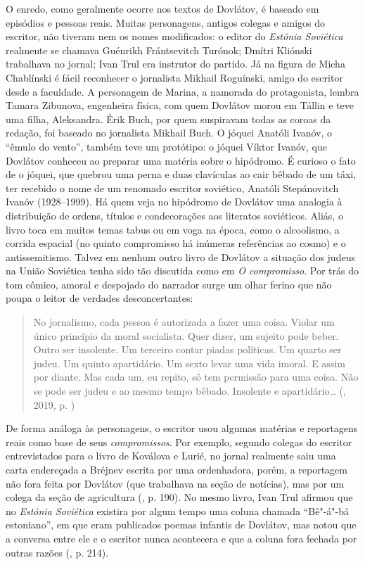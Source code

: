 O enredo, como geralmente ocorre nos textos de Dovlátov, é baseado em
episódios e pessoas reais. Muitas personagens, antigos colegas e amigos
do escritor, não tiveram nem os nomes modificados: o editor do
\emph{Estônia Soviética} realmente se chamava Guénrikh Frántsevitch
Turónok; Dmítri Kliónski trabalhava no jornal; Ivan Trul era instrutor
do partido. Já na figura de Micha Chablínski é fácil reconhecer o
jornalista Mikhail Roguínski, amigo do escritor desde a faculdade. A
personagem de Marina, a namorada do protagonista, lembra Tamara
Zibunova, engenheira física, com quem Dovlátov morou em Tállin e teve
uma filha, Aleksandra. Érik Buch, por quem suspiravam todas as coroas da
redação, foi baseado no jornalista Mikhail Buch. O jóquei Anatóli
Ivanóv, o ``êmulo do vento'', também teve um protótipo: o jóquei Víktor
Ivanóv, que Dovlátov conheceu ao preparar uma matéria sobre o hipódromo.
É curioso o fato de o jóquei, que quebrou uma perna e duas clavículas ao
cair bêbado de um táxi, ter recebido o nome de um renomado escritor
soviético, Anatóli Stepánovitch Ivanóv (1928--1999). Há quem veja no
hipódromo de Dovlátov uma analogia à distribuição de ordens, títulos e
condecorações aos literatos soviéticos. Aliás, o livro toca em muitos
temas tabus ou em voga na época, como o alcoolismo, a corrida espacial (no quinto
compromisso há inúmeras referências ao cosmo) e o antissemitismo. Talvez
em nenhum outro livro de Dovlátov a situação dos judeus na União
Soviética tenha sido tão discutida como em \emph{O compromisso}. Por trás
do tom cômico, amoral e despojado do narrador surge um olhar ferino que
não poupa o leitor de verdades desconcertantes:

\begin{quotation}
No jornalismo, cada pessoa é autorizada a fazer uma coisa. Violar um
único princípio da moral socialista. Quer dizer, um sujeito pode beber.
Outro ser insolente. Um terceiro contar piadas políticas. Um quarto ser
judeu. Um quinto apartidário. Um sexto levar uma vida imoral. E assim
por diante. Mas cada um, eu repito, só tem permissão para uma coisa. Não
se pode ser judeu e ao mesmo tempo bêbado. Insolente e apartidário\ldots{}
{}(, 2019, p. \pageref{ref2})
\end{quotation}

De forma análoga às personagens, o escritor usou algumas matérias e
reportagens reais como base de seus \emph{compromissos}. Por exemplo, segundo
colegas do escritor entrevistados para o livro de Koválova e Lurié, no jornal
realmente saiu uma carta endereçada a Bréjnev escrita por uma
ordenhadora, porém, a reportagem não fora feita por Dovlátov (que
trabalhava na seção de notícias), mas por um colega da seção de
agricultura (, p. 190). No mesmo livro, Ivan Trul afirmou que no
\emph{Estônia Soviética} existira por algum tempo uma coluna chamada
``Bê"-á"-bá estoniano'', em que eram publicados poemas infantis de
Dovlátov, mas notou que a conversa entre ele e o escritor nunca
acontecera e que a coluna fora fechada por outras razões (, p.
214).

